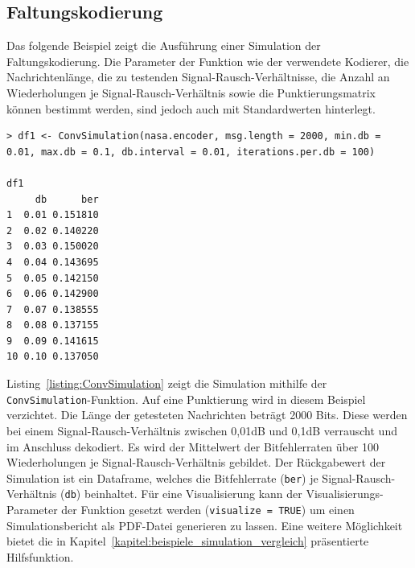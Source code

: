 \subsection{Faltungskodierung}
\label{kapitel:beispiele_simulation_faltungskodierung}
Das folgende Beispiel zeigt die Ausführung einer Simulation der Faltungskodierung. Die Parameter der Funktion wie der verwendete Kodierer, die Nachrichtenlänge, die zu testenden Signal-Rausch-Verhältnisse, die Anzahl an Wiederholungen je Signal-Rausch-Verhältnis sowie die Punktierungsmatrix können bestimmt werden, sind jedoch auch mit Standardwerten hinterlegt.
\begin{lstlisting}[caption=Simulation der Faltungskodierung, label={listing:ConvSimulation}, float=!th]
> df1 <- ConvSimulation(nasa.encoder, msg.length = 2000, min.db = 0.01, max.db = 0.1, db.interval = 0.01, iterations.per.db = 100)

df1
     db      ber
1  0.01 0.151810
2  0.02 0.140220
3  0.03 0.150020
4  0.04 0.143695
5  0.05 0.142150
6  0.06 0.142900
7  0.07 0.138555
8  0.08 0.137155
9  0.09 0.141615
10 0.10 0.137050
\end{lstlisting}
Listing~\ref{listing:ConvSimulation} zeigt die Simulation mithilfe der \texttt{ConvSimulation}-Funktion. Auf eine Punktierung wird in diesem Beispiel verzichtet. Die Länge der getesteten Nachrichten beträgt 2000 Bits. Diese werden bei einem Signal-Rausch-Verhältnis zwischen 0,01dB und 0,1dB verrauscht und im Anschluss dekodiert. Es wird der Mittelwert der Bitfehlerraten über 100 Wiederholungen je Signal-Rausch-Verhältnis gebildet. Der Rückgabewert der Simulation ist ein Dataframe, welches die Bitfehlerrate (\texttt{ber}) je Signal-Rausch-Verhältnis (\texttt{db}) beinhaltet. Für eine Visualisierung kann der Visualisierungs-Parameter der Funktion gesetzt werden (\texttt{visualize = TRUE}) um einen Simulationsbericht als PDF-Datei generieren zu lassen. Eine weitere Möglichkeit bietet die in Kapitel~\ref{kapitel:beispiele_simulation_vergleich} präsentierte Hilfsfunktion.

